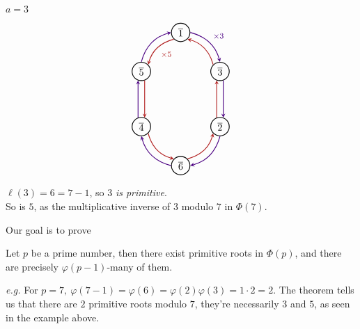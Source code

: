 \vspace*{2em}

\begin{minipage}{0.15\textwidth}
\qquad $a = 3$ 
\end{minipage}
\begin{minipage}{0.25\textwidth}
\[\begin{tikzpicture}[->,>=stealth,auto,node distance=2cm,
  thick,main node/.style={circle,draw}]

  \node[main node] (1) {$\overline{1}$};
  \node[main node] (2) [below right of=1] {$\overline{3}$};
  \node[main node] (3) [below of=2] {$\overline{2}$};
  \node[main node] (4) [below left of=3] {$\overline{6}$};
  \node[main node] (5) [above left of=4] {$\overline{4}$};
  \node[main node] (6) [above of=5] {$\overline{5}$};
\path[every node/.style={font=\sffamily\small}]
	(1.0) edge[indigo,bend left] node[] {\footnotesize$\times 3$} (2.90)
	(2.135) edge[firebrick,bend right] node[] {} (1.315)
	(2.290) edge[indigo] node[] {} (3.70)
	(3.110) edge[firebrick] node[] {} (2.250)
	(3.270) edge[indigo,bend left] node[] {} (4.0)
	(4.45) edge[firebrick,bend right] node[] {} (3.225)
    (4.180) edge[indigo,bend left] node[] {} (5.270)
    (5.315) edge[firebrick,bend right] node[] {} (4.135)
    (5.110) edge[indigo] node[] {} (6.250)
    (6.290) edge[firebrick] node[] {} (5.70)
    (6.90) edge[indigo,bend left] node[] {} (1.180)
    (1.225) edge[firebrick,bend right] node[] {\footnotesize$\times 5$} (6.45);
\end{tikzpicture}\]
\end{minipage}
\qquad
\begin{minipage}{0.53\textwidth}
$\ell(3) = 6 = 7 - 1$, so $3$ \emph{is primitive}.\\[0.5em]
So is $5$, as the multiplicative inverse of $3$ modulo $7$ in $\Phi(7)$. 
\end{minipage}

\newpage

Our goal is to prove
\begin{theorem*}[Gauss]
Let $p$ be a prime number, then there exist primitive roots in $\Phi(p)$, and there are precisely $\varphi(p-1)$-many of them.
\end{theorem*}
\emph{e.g.} For $p = 7,\ \varphi(7-1) = \varphi(6) = \varphi(2)\varphi(3) = 1\cdot 2 = 2$. The theorem tells us that there are $2$ primitive roots modulo $7$, they're necessarily $3$ and $5$, as seen in the example above.

\vspace*{2em}

